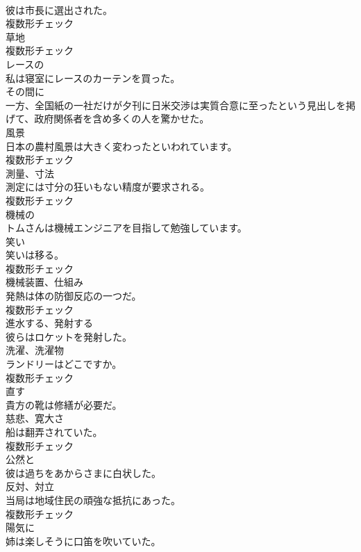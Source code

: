 \documentclass[8pt]{extreport}
\begin{document}
\begin{CJK}{UTF8}{min}
\\	彼は市長に選出された。	
\\	複数形チェック
\\	[名詞]	草地	
\\	複数形チェック
\\	[形容詞]	レースの	
\\	私は寝室にレースのカーテンを買った。	
\\	[副詞]	その間に	
\\	一方、全国紙の一社だけが夕刊に日米交渉は実質合意に至ったという見出しを掲げて、政府関係者を含め多くの人を驚かせた。	
\\	[名詞]	風景	
\\	日本の農村風景は大きく変わったといわれています。	
\\	複数形チェック
\\	[名詞]	測量、寸法	
\\	測定には寸分の狂いもない精度が要求される。	
\\	複数形チェック
\\	[形容詞]	機械の	
\\	トムさんは機械エンジニアを目指して勉強しています。	
\\	[名詞]	笑い	
\\	笑いは移る。	
\\	複数形チェック
\\	[名詞]	機械装置、仕組み	
\\	発熱は体の防御反応の一つだ。	
\\	複数形チェック
\\	[動詞]	進水する、発射する	
\\	彼らはロケットを発射した。	
\\	[名詞]	洗濯、洗濯物	
\\	ランドリーはどこですか。	
\\	複数形チェック
\\	[動詞]	直す	
\\	貴方の靴は修繕が必要だ。	
\\	[名詞]	慈悲、寛大さ	
\\	船は翻弄されていた。	
\\	複数形チェック
\\	[形容詞]	公然と	
\\	彼は過ちをあからさまに白状した。	
\\	[名詞]	反対、対立	
\\	当局は地域住民の頑強な抵抗にあった。	
\\	複数形チェック
\\	[副詞]	陽気に	
\\	姉は楽しそうに口笛を吹いていた。	

\end{CJK}
\end{document}
